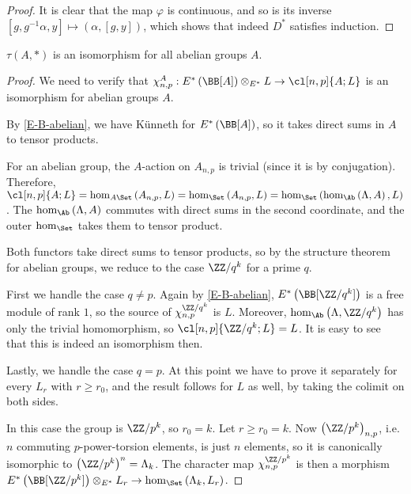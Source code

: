 \begin{proof}
	It is clear that the map $\varphi$ is continuous, and so is its inverse $\left[g, g^{-1} \alpha, y\right] \mapsto \left(\alpha, \left[g, y\right]\right)$, which shows that indeed $D^*$ satisfies induction.
\end{proof}

\begin{lemma}
	$\tau\left(A, *\right)$ is an isomorphism for all abelian groups $A$.
\end{lemma}

\begin{proof}
	We need to verify that
	$
	\chi_{n,p}^A:
	E^*\left(\BB[A]\right) \otimes_{E^*} L
	\to \cl[n,p]{A; L}
	$
	is an isomorphism for abelian groups $A$.
	
	By \ref{E-B-abelian}, we have K\"unneth for $E^*\left(\BB[A]\right)$, so it takes direct sums in $A$ to tensor products.
	
	For an abelian group, the $A$-action on $A_{n,p}$ is trivial (since it is by conjugation).
	Therefore,
	$
	\cl[n,p]{A; L}
	= \hom_{A\Set}\left(A_{n,p}, L\right)
	= \hom_{\Set}\left(A_{n,p}, L\right)
	= \hom_{\Set}\left(\hom_{\Ab}\left(\Lambda, A\right), L\right)
	$.
	The $\hom_{\Ab}\left(\Lambda, A\right)$ commutes with direct sums in the second coordinate, and the outer $\hom_{\Set}$ takes them to tensor product.
	
	Both functors take direct sums to tensor products, so by the structure theorem for abelian groups, we reduce to the case $\ZZ/q^k$ for a prime $q$.
	
	First we handle the case $q \neq p$.
	Again by \ref{E-B-abelian}, $E^*\left(\BB[\ZZ/q^k]\right)$ is a free module of rank $1$, so the source of $\chi_{n,p}^{\ZZ/q^k}$ is $L$.
	Moreover, $\hom_{\Ab}\left(\Lambda, \ZZ/q^k\right)$ has only the trivial homomorphism, so $\cl[n,p]{\ZZ/q^k; L} = L$.
	It is easy to see that this is indeed an isomorphism then.
	
	Lastly, we handle the case $q = p$.
	At this point we have to prove it separately for every $L_r$ with $r \geq r_0$, and the result follows for $L$ as well, by taking the colimit on both sides.
	
	In this case the group is $\ZZ/p^k$, so $r_0 = k$.
	Let $r \geq r_0 = k$.
	Now $\left(\ZZ/p^k\right)_{n,p}$, i.e. $n$ commuting $p$-power-torsion elements, is just $n$ elements, so it is canonically isomorphic to $\left(\ZZ/p^k\right)^n = \Lambda_k$.
	The character map $\chi_{n,p}^{\ZZ/p^k}$ is then a morphism $E^*\left(\BB[\ZZ/p^k]\right) \otimes_{E^*} L_r \to \hom_{\Set}\left(\Lambda_k, L_r\right)$.
	

\end{proof}
